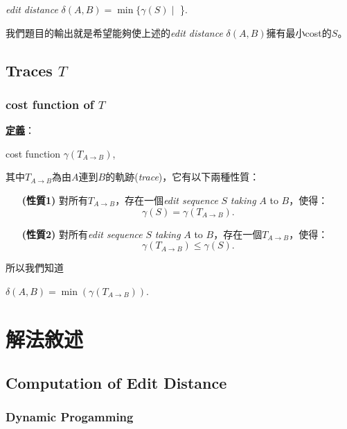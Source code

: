 \documentclass[15pt]{extarticle}
\begin{document}
\begin{center}
\textit{edit distance} $\delta(A,B)=\min\{\gamma(S)\mid$ \}.
\end{center}

我們題目的輸出就是希望能夠使上述的\textit{edit distance} $\delta(A,B)$擁有最小cost的$S$。

\subsection{Traces $T$}

\subsubsection{cost function of $T$}

\textbf{\uline{定義}}：

\begin{center}
cost function $\gamma(T_{A\to B})$,
\end{center}

其中$T_{A\to B}$為由$A$連到$B$的軌跡(\textit{trace})，它有以下兩種性質：
\begin{enumerate}
    \setlength\itemindent{1cm}
    \item [\textbf{(性質1)}] 對所有$T_{A\to B}$，存在一個\textit{edit sequence} $S$ \textit{taking} $A$ to $B$，使得：
    $$\gamma(S)=\gamma(T_{A\to B}).$$
    
    \item [\textbf{(性質2)}] 對所有\textit{edit sequence} $S$ \textit{taking} $A$ to $B$，存在一個$T_{A\to B}$，使得：
    $$\gamma(T_{A\to B})\le\gamma(S).$$
\end{enumerate}

所以我們知道 

\begin{center}
$\delta(A,B)=\min(\gamma(T_{A\to B}))$.
\end{center} 

\newpage
\section{解法敘述}
\subsection{Computation of Edit Distance}
\subsubsection{Dynamic Progamming}
\end{document}
